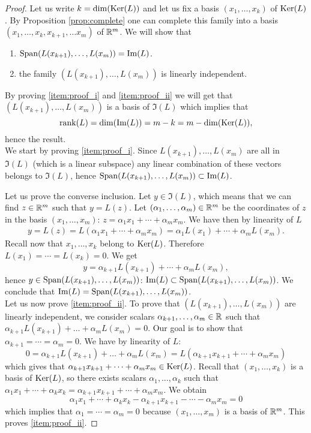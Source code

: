 \documentclass[11pt,nocut]{article}
\begin{document}
\begin{proof}
	Let us write $k = {{\rm dim}}({{\rm Ker}}(L))$ and let us fix a basis $(x_1, \dots, x_k)$ of ${{\rm Ker}}(L)$. By Proposition \ref{prop:complete} one can complete this family into a basis $(x_1, \dots, x_k, x_{k+1}, \dots x_m)$ of $\mathbb{R}^m$.
	We will show that
	\begin{enumerate}[label=(\roman*)]
		\item \label{item:proof_i} ${{\rm Span}}(L(x_{k+1}), \dots, L(x_m)) = {{\rm Im}}(L)$.
		\item \label{item:proof_ii} the family $(L(x_{k+1}), \dots, L(x_{m}))$ is linearly independent.
	\end{enumerate}

	By proving \ref{item:proof_i} and \ref{item:proof_ii} we will get that $(L(x_{k+1}), \dots, L(x_{m}))$ is a basis of $\Im(L)$ which implies that 
	$$
	{{\rm rank}}(L) = {{\rm dim}}({{\rm Im}}(L)) = m - k = m - {{\rm dim}}({{\rm Ker}}(L)),
	$$
	hence the result.
\\

We start by proving \ref{item:proof_i}. Since $L(x_{k+1}), \dots, L(x_m)$ are all in $\Im(L)$ (which is a linear subspace) any linear combination of these vectors belongs to $\Im(L)$, hence ${{\rm Span}}(L(x_{k+1}), \dots, L(x_m)) \subset {{\rm Im}}(L)$.

Let us prove the converse inclusion.
Let $y \in \Im(L)$, which means that we can find $z \in \mathbb{R}^m$ such that $y = L(z)$. Let $(\alpha_1, \dots, \alpha_m) \in \mathbb{R}^m$ be the coordinates of $z$ in the basis $(x_1, \dots, x_m)$: $z = \alpha_1 x_1 + \cdots + \alpha_m x_m$. We have then by linearity of $L$
\begin{align*}
y = L(z) = L(\alpha_1 x_1 + \cdots + \alpha_m x_m)
= \alpha_1 L(x_1) + \cdots + \alpha_m L(x_m).
\end{align*}
Recall now that $x_1, \dots, x_k$ belong to ${{\rm Ker}}(L)$. Therefore $L(x_1) = \cdots = L(x_k) = 0$. We get
$$
y = \alpha_{k+1} L(x_{k+1}) + \cdots + \alpha_{m} L(x_{m}),
$$
hence $y \in {{\rm Span}}(L(x_{k+1}), \dots, L(x_m))$: ${{\rm Im}}(L) \subset {{\rm Span}}(L(x_{k+1}), \dots, L(x_m))$. We conclude that ${{\rm Im}}(L) = {{\rm Span}}(L(x_{k+1}), \dots, L(x_m))$.
\\

Let us now prove \ref{item:proof_ii}. To prove that $(L(x_{k+1}), \dots, L(x_m))$ are linearly independent, we consider scalars $\alpha_{k+1}, \dots, \alpha_m \in \mathbb{R}$ such that $\alpha_{k+1} L(x_{k+1}) + \dots + \alpha_m L(x_m) =0$. Our goal is to show that $\alpha_{k+1} = \cdots = \alpha_m = 0$. We have by linearity of $L$:
$$
0 =\alpha_{k+1} L(x_{k+1}) + \dots + \alpha_m L(x_m) = L(\alpha_{k+1} x_{k+1} + \cdots + \alpha_m x_m)
$$
which gives that $\alpha_{k+1} x_{k+1} + \cdots + \alpha_m x_m \in {{\rm Ker}}(L)$. Recall that $(x_1, \dots, x_k)$ is a basis of ${{\rm Ker}}(L)$, so there exists scalars $\alpha_1, \dots, \alpha_k$ such that $\alpha_1 x_1 + \cdots + \alpha_k x_k = \alpha_{k+1} x_{k+1} + \cdots + \alpha_m x_m$. We obtain
$$
\alpha_1 x_1 + \cdots + \alpha_k x_k - \alpha_{k+1} x_{k+1} - \cdots - \alpha_m x_m = 0
$$
which implies that $\alpha_1 = \cdots = \alpha_m = 0$ because $(x_1, \dots, x_m)$ is a basis of $\mathbb{R}^m$. This proves \ref{item:proof_ii}.
\end{proof}
\end{document}
